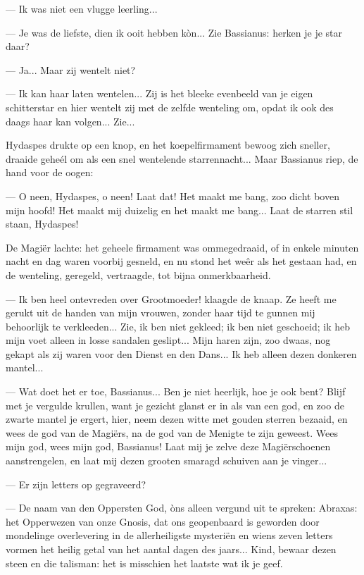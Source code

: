 \documentclass[a4paper, 12pt, oneside, dutch]{article}
\begin{document}
--- Ik was niet een vlugge leerling...

--- Je was de liefste, dien ik ooit hebben kòn... Zie Bassianus: herken je je star daar?

--- Ja... Maar zij wentelt niet?

--- Ik kan haar laten wentelen... Zij is het bleeke evenbeeld van je eigen schitterstar en hier wentelt zij met de zelfde wenteling om, opdat ik ook des daags haar kan volgen... Zie...

Hydaspes drukte op een knop, en het koepelfirmament bewoog zich sneller, draaide geheél om als een snel wentelende starrennacht... Maar Bassianus riep, de hand voor de oogen:

--- O neen, Hydaspes, o neen! Laat dat! Het maakt me bang, zoo dicht boven mijn hoofd! Het maakt mij duizelig en het maakt me bang... Laat de starren stil staan, Hydaspes!

De Magiër lachte: het geheele firmament was ommegedraaid, of in enkele minuten nacht en dag waren voorbij gesneld, en nu stond het weêr als het gestaan had, en de wenteling, geregeld, vertraagde, tot bijna onmerkbaarheid.

--- Ik ben heel ontevreden over Grootmoeder! klaagde de knaap. Ze heeft me gerukt uit de handen van mijn vrouwen, zonder haar tijd te gunnen mij behoorlijk te verkleeden... Zie, ik ben niet gekleed; ik ben niet geschoeid; ik heb mijn voet alleen in losse sandalen geslipt... Mijn haren zijn, zoo dwaas, nog gekapt als zij waren voor den Dienst en den Dans... Ik heb alleen dezen donkeren mantel...

--- Wat doet het er toe, Bassianus... Ben je niet heerlijk, hoe je ook bent? Blijf met je vergulde krullen, want je gezicht glanst er in als van een god, en zoo de zwarte mantel je ergert, hier, neem dezen witte met gouden sterren bezaaid, en wees de god van de Magiërs, na de god van de Menigte te zijn geweest. Wees mijn god, wees mijn god, Bassianus! Laat mij je zelve deze Magiërschoenen aanstrengelen, en laat mij dezen grooten smaragd schuiven aan je vinger...

--- Er zijn letters op gegraveerd?

--- De naam van den Oppersten God, òns alleen vergund uit te spreken: Abraxas: het Opperwezen van onze Gnosis, dat ons geopenbaard is geworden door mondelinge overlevering in de allerheiligste mysteriën en wiens zeven letters vormen het heilig getal van het aantal dagen des jaars... Kind, bewaar dezen steen en die talisman: het is misschien het laatste wat ik je geef.
\end{document}
